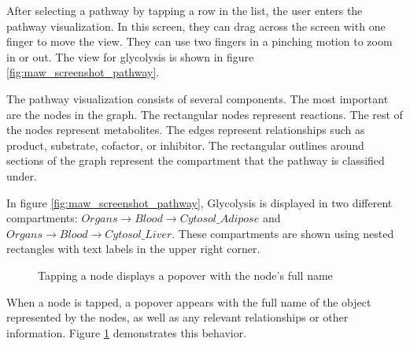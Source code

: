 After selecting a pathway by tapping a row in the list, the user enters the
pathway visualization. In this screen, they can drag across the screen with one
finger to move the view. They can use two fingers in a pinching motion to zoom
in or out. The view for glycolysis is shown in figure
\ref{fig:maw_screenshot_pathway}.

The pathway visualization consists of several components. The most important are
the nodes in the graph. The rectangular nodes represent reactions. The rest of
the nodes represent metabolites. The edges represent relationships such as
product, substrate, cofactor, or inhibitor. The rectangular outlines around
sections of the graph represent the compartment that the pathway is classified
under.

In figure \ref{fig:maw_screenshot_pathway}, Glycolysis is displayed in two
different compartments: $Organs \rightarrow Blood \rightarrow Cytosol\_Adipose$
and $Organs \rightarrow Blood \rightarrow Cytosol\_Liver$. These compartments
are shown using nested rectangles with text labels in the upper right corner.

\begin{figure}[hbtp]
    \caption{\label{fig:maw_screenshot_popover} Tapping a node displays a
    popover with the node's full name}
\end{figure}

When a node is tapped, a popover appears with the full name of the object
represented by the nodes, as well as any relevant relationships or other
information. Figure \ref{fig:maw_screenshot_popover} demonstrates this behavior.
